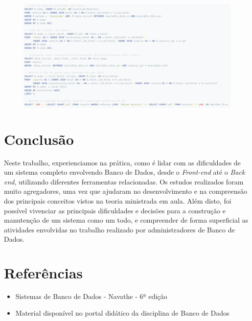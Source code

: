 \documentclass[a4paper, 12pt]{article}
\begin{document}
\begin{figure}[H]
    \centering
    \includegraphics[width=1.15\textwidth]{Images/2.png}
    \label{fig:exampleFig4}
\end{figure}

\section{Conclusão}

Neste trabalho, experienciamos na prática, como é lidar com as dificuldades de um sistema completo envolvendo Banco de Dados, desde o \emph{Front-end} até o \emph{Back end}, utilizando diferentes ferramentas relacionadas. Os estudos realizados foram muito agregadores, uma vez que ajudaram no desenvolvimento e na compreensão dos principais conceitos vistos na teoria ministrada em aula. Além disto, foi possível vivenciar as principais dificuldades e decisões para a construção e manutenção de um sistema como um todo, e compreender de forma superficial as atividades envolvidas no trabalho realizado por administradores de Banco de Dados.

\section*{Referências}

\begin{itemize}
    \item Sistemas de Banco de Dados - Navathe - 6ª edição
    \item Material disponível no portal didático da disciplina de Banco de Dados
\end{itemize}
\end{document}
